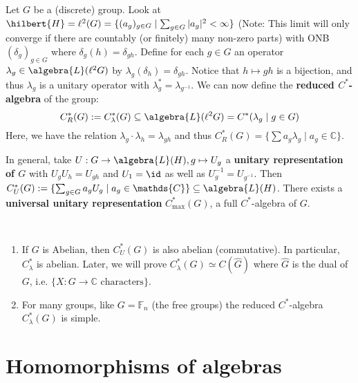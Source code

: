 \documentclass[a4paper]{article}
\begin{document}
\begin{example}
	Let $G$ be a (discrete) group.
	Look at $\hilbert{H} = \ell^2(G) = \{(a_g)_{g \in G} \mid \sum_{g \in G} |a_g|^2 < \infty\}$
	(Note: This limit will only converge if there are countably (or finitely) many non-zero parts)
	with ONB $(\delta_g)_{g \in G}$ where $\delta_g(h) = \delta_{gh}$.
	Define for each $g \in G$ an operator $\lambda_g \in \algebra{L}(\ell^2 G)$ by $\lambda_g(\delta_h) = \delta_{gh}$.
	Notice that $h \mapsto gh$ is a bijection, and thus $\lambda_g$ is a unitary operator with $\lambda_g^* = \lambda_{g^{-1}}$. We can now define the \textbf{reduced $C^*$-algebra} of the group:
	\begin{equation*}
		C_R^*(G) := C_\lambda^*(G) \subseteq \algebra{L}(\ell^2 G) = C^*(\lambda_g \mid g \in G)
	\end{equation*}
	Here, we have the relation $\lambda_g \cdot \lambda_h = \lambda_{gh}$ and thus $C_R^*(G) = \{\sum a_g \lambda_g \mid a_g \in \mathds{C}\}$.

	In general, take $U: G \to \algebra{L}(H), g \mapsto U_g$ a \textbf{unitary representation of $G$} with $U_g U_h = U_{gh}$ and $U_1 = \id$ as well as $U_g^{-1} = U_{g^{-1}}$. Then $C^*_U(G) := \{\sum_{g \in G} a_g U_g \mid a_g \in \mathds{C}\} \subseteq \algebra{L}(H)$. There exists a \textbf{universal unitary representation} $C^*_\mathrm{max}(G)$, a full $C^*$-algebra of $G$.
\end{example}

\begin{remark}~
	\begin{enumerate}
		\item If $G$ is Abelian, then $C_U^*(G)$ is also abelian (commutative). In particular, $C_\lambda^*$ is abelian. Later, we will prove $C_\lambda^*(G) \simeq C(\hat G)$ where $\hat G$ is the dual of $G$, i.e. $\{X: G \to \mathds{C} \text{ characters}\}$.
		\item For many groups, like $G = \mathds{F}_n$ (the free groups) the reduced $C^*$-algebra $C^*_\lambda(G)$ is simple.
	\end{enumerate}
\end{remark}

\section{Homomorphisms of algebras}
\end{document}
